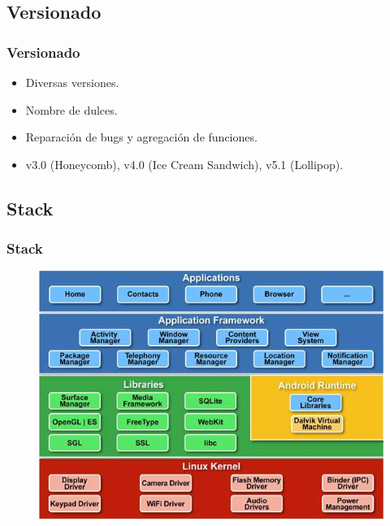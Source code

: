 \subsection{Versionado}
\begin{frame}
  \frametitle{Versionado}
  \begin{itemize}
    \item Diversas versiones.    
    
    \item Nombre de dulces.
    
    \item Reparación de bugs y agregación de funciones.    
    
    \item v3.0 (Honeycomb), v4.0 (Ice Cream Sandwich), v5.1 (Lollipop).
  \end{itemize}
\end{frame}

\subsection{Stack}
\begin{frame}
  \frametitle{Stack}
  \begin{figure}
      \includegraphics[scale=0.4]{images/stack.jpg}
  \end{figure}
\end{frame}

